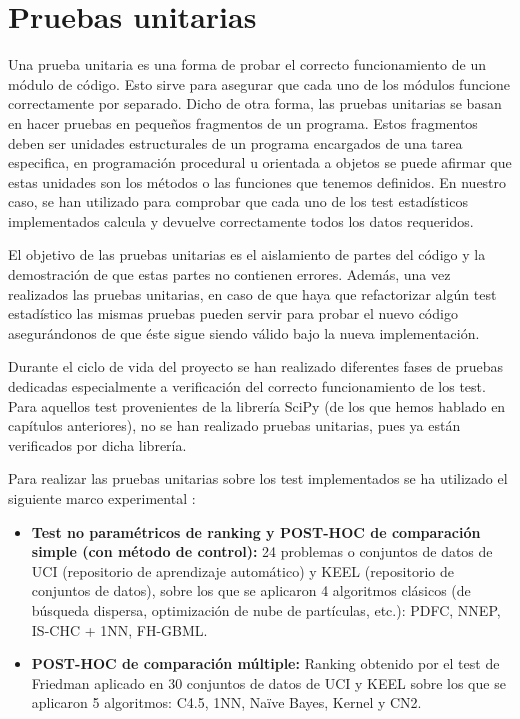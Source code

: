 \section{Pruebas unitarias}
Una prueba unitaria es una forma de probar el correcto funcionamiento de un módulo de código. Esto sirve para asegurar que cada uno de los módulos funcione correctamente por separado. Dicho de otra forma, las pruebas unitarias se basan en hacer pruebas en pequeños fragmentos de un programa. Estos fragmentos deben ser unidades estructurales de un programa encargados de una tarea especifica, en programación procedural u orientada a objetos se puede afirmar que estas unidades son los métodos o las funciones que tenemos definidos. En nuestro caso, se han utilizado para comprobar que cada uno de los test estadísticos implementados calcula y devuelve correctamente todos los datos requeridos.

El objetivo de las pruebas unitarias es el aislamiento de partes del código y la demostración de que estas partes no contienen errores. Además, una vez realizados las pruebas unitarias, en caso de que haya que refactorizar algún test estadístico las mismas pruebas pueden servir para probar el nuevo código asegurándonos de que éste sigue siendo válido bajo la nueva implementación.

Durante el ciclo de vida del proyecto se han realizado diferentes fases de pruebas dedicadas especialmente a verificación del correcto funcionamiento de los test. Para aquellos test provenientes de la librería SciPy (de los que hemos hablado en capítulos anteriores), no se han realizado pruebas unitarias, pues ya están verificados por dicha librería.

Para realizar las pruebas unitarias sobre los test implementados se ha utilizado el siguiente marco experimental \cite{no_parametricos}:
\begin{itemize}
\item \textbf{Test no paramétricos de ranking y POST-HOC de comparación simple (con método de control):} 24 problemas o conjuntos de datos de UCI \cite{uci} (repositorio de aprendizaje automático) y KEEL \cite{keel} (repositorio de conjuntos de datos), sobre los que se aplicaron 4 algoritmos clásicos (de búsqueda dispersa, optimización de nube de partículas, etc.): PDFC, NNEP, IS-CHC + 1NN, FH-GBML.
\item \textbf{POST-HOC de comparación múltiple:} Ranking obtenido por el test de Friedman aplicado en 30 conjuntos de datos de UCI y KEEL sobre los que se aplicaron 5 algoritmos: C4.5, 1NN, Naïve Bayes, Kernel y CN2.
\end{itemize}

